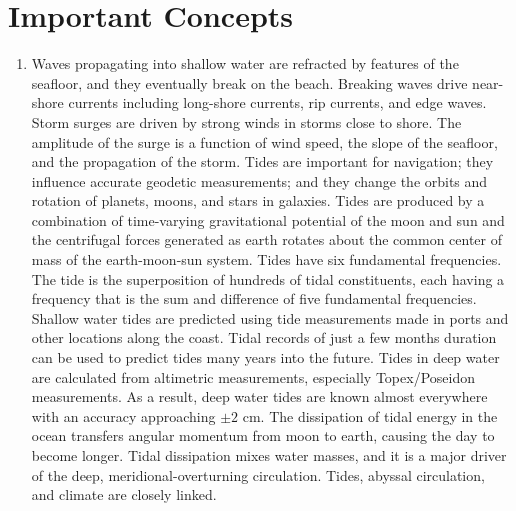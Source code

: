 \section{Important Concepts}
\begin{enumerate}
\item 
Waves propagating into shallow water are refracted by features of the seafloor, and they eventually break on the beach. Breaking waves drive near-shore currents including long-shore currents, rip currents, and edge waves.
\vitem 
Storm surges are driven by strong winds in storms close to shore. The amplitude of the surge is a function of wind speed, the slope of the seafloor, and the propagation of the storm.
\vitem 
Tides are important for navigation; they influence accurate geodetic measurements; and they change the orbits and rotation of planets, moons, and stars in galaxies.
\vitem
Tides are produced by a combination of time-varying gravitational potential of the moon and sun and the centrifugal forces generated as earth rotates about the common center of mass of the earth-moon-sun system.
\vitem
Tides have six fundamental frequencies. The tide is the superposition of hundreds of tidal constituents, each having a frequency that is the sum and difference of five fundamental frequencies.
\vitem
Shallow water tides are predicted using tide measurements made in ports and other locations along the coast. Tidal records of just a few months duration can be used to predict tides many years into the future.
\vitem
Tides in deep water are calculated from altimetric measurements, especially Topex/Poseidon measurements. As a result, deep water tides are known almost everywhere with an accuracy approaching $\pm 2$ cm.
\vitem
The dissipation of tidal energy in the ocean transfers angular momentum from moon to earth, causing the day to become longer.
\vitem
Tidal dissipation mixes water masses, and it is a major driver of the deep, meridional-overturning circulation. Tides, abyssal circulation, and climate are closely linked.
\end{enumerate}


